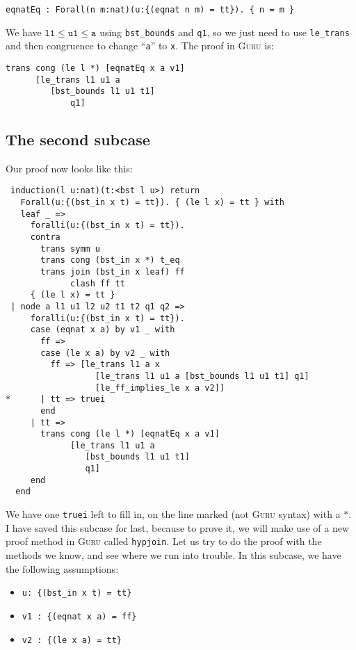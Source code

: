 \documentclass{book}[12pt]
\newcommand{\guru}[0]{\textsc{Guru}\xspace}
\begin{document}
\begin{verbatim}
eqnatEq : Forall(n m:nat)(u:{(eqnat n m) = tt}). { n = m } 
\end{verbatim}

\noindent We have $\texttt{l1} \le \texttt{u1} \le \texttt{a}$ using
\texttt{bst\_bounds} and \texttt{q1}, so we just need to use
\texttt{le\_trans} and then congruence to change ``\texttt{a}'' to
\texttt{x}.  The proof in \guru is:

\begin{verbatim}
trans cong (le l *) [eqnatEq x a v1]
      [le_trans l1 u1 a
         [bst_bounds l1 u1 t1]
             q1]
\end{verbatim}

\subsection{The second subcase}
\label{ch8:longpf}

Our proof now looks like this:

\begin{verbatim}
 induction(l u:nat)(t:<bst l u>) return
   Forall(u:{(bst_in x t) = tt}). { (le l x) = tt } with
   leaf _ => 
     foralli(u:{(bst_in x t) = tt}).
     contra
       trans symm u
       trans cong (bst_in x *) t_eq
       trans join (bst_in x leaf) ff
             clash ff tt
     { (le l x) = tt }
 | node a l1 u1 l2 u2 t1 t2 q1 q2 => 
     foralli(u:{(bst_in x t) = tt}).
     case (eqnat x a) by v1 _ with
       ff =>
       case (le x a) by v2 _ with
         ff => [le_trans l1 a x 
                  [le_trans l1 u1 a [bst_bounds l1 u1 t1] q1]
                  [le_ff_implies_le x a v2]]
*      | tt => truei
       end
     | tt => 
       trans cong (le l *) [eqnatEq x a v1]
             [le_trans l1 u1 a
                [bst_bounds l1 u1 t1]
                q1]
     end
  end
\end{verbatim}

\noindent We have one \texttt{truei} left to fill in, on the line
marked (not \guru syntax) with a $*$.  I have saved this subcase
for last, because to prove it, we will make use of a new proof method
in \guru called \texttt{hypjoin}.  Let us try to do the proof with
the methods we know, and see where we run into trouble.  In this 
subcase, we have the following assumptions:

\begin{itemize}
\item \texttt{u: \{(bst\_in x t) = tt\}}
\item \texttt{v1 : \{(eqnat x a) = ff\}}
\item \texttt{v2 : \{(le x a) = tt\}}
\end{itemize}
\end{document}

